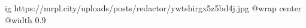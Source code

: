  
 
 
 
 

\ifcmt
  ig https://mrpl.city/uploads/posts/redactor/ywtshirgx5z5bd4j.jpg
  @wrap center
  @width 0.9
\fi
